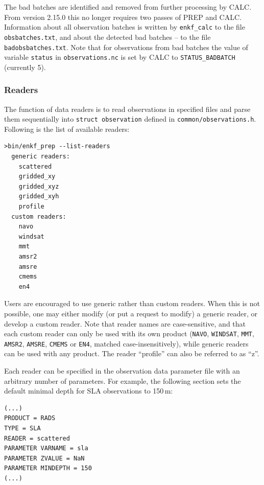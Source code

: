 \documentclass[11pt]{report}
\begin{document}
The bad batches are identified and removed from further processing by CALC.
From version 2.15.0 this no longer requires two passes of PREP and CALC.
Information about all observation batches is written by \verb|enkf_calc| to the file \verb|obsbatches.txt|, and about the detected bad batches -- to the file \verb|badobsbatches.txt|.
Note that for observations from bad batches the value of variable \verb|status| in \verb|observations.nc| is set by CALC to \verb|STATUS_BADBATCH| (currently 5).

\subsubsection{Readers}

The function of data readers is to read observations in specified files and parse them sequentially into \verb|struct observation| defined in \verb|common/observations.h|.
Following is the list of available readers:
\begin{Verbatim}
>bin/enkf_prep --list-readers
  generic readers:
    scattered
    gridded_xy
    gridded_xyz
    gridded_xyh
    profile
  custom readers:
    navo
    windsat
    mmt
    amsr2
    amsre
    cmems
    en4
\end{Verbatim}

Users are encouraged to use generic rather than custom readers.
When this is not possible, one may either modify (or put a request to modify) a generic reader, or develop a custom reader.
Note that reader names are case-sensitive, and that each custom reader can only be used with its own product (\verb|NAVO|, \verb|WINDSAT|, \verb|MMT|, \verb|AMSR2|, \verb|AMSRE|, \verb|CMEMS| or \verb|EN4|, matched case-insensitively), while generic readers can be used with any product.
The reader ``profile'' can also be referred to as ``z''.

Each reader can be specified in the observation data parameter file with an arbitrary number of parameters.
For example, the following section sets the default minimal depth for SLA observations to 150\,m:
\begin{Verbatim}
(...)
PRODUCT = RADS
TYPE = SLA
READER = scattered
PARAMETER VARNAME = sla
PARAMETER ZVALUE = NaN
PARAMETER MINDEPTH = 150
(...)
\end{Verbatim}
\end{document}
